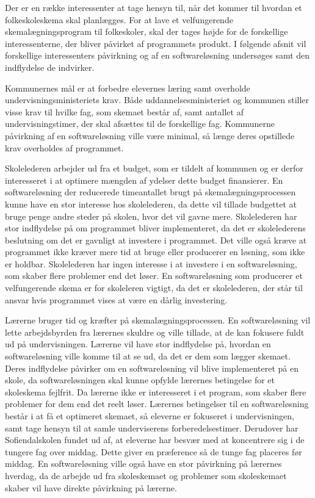 Der er en række interessenter at tage hensyn til, når det kommer til hvordan et folkeskoleskema skal planlægges. For at lave et velfungerende skemalægningsprogram til folkeskoler, skal der tages højde for de forskellige interessenterne, der bliver påvirket af programmets produkt. I følgende afsnit vil forskellige interessenters påvirkning og af en softwareløsning undersøges samt den indflydelse de indvirker. 


Kommunernes mål er at forbedre elevernes læring samt overholde undervisningsministeriets krav. Både uddannelsesministeriet og kommunen stiller visse krav til hvilke fag, som skemaet består af, samt antallet af undervisningstimer, der skal afsættes til de forskellige fag. Kommunerne påvirkning af en softwareløsning ville være minimal, så længe deres opstillede krav overholdes af programmet.


Skolelederen arbejder ud fra et budget, som er tildelt af kommunen og er derfor interesseret i at optimere mængden af ydelser dette budget finansierer. En softwareløsning der reducerede timeantallet brugt på skemalægningsprocessen kunne have en stor interesse hos skolelederen, da dette vil tillade budgettet at bruge penge andre steder på skolen, hvor det vil gavne mere. Skolelederen har stor indflydelse på om programmet bliver implementeret, da det er skolelederens beslutning om det er gavnligt at investere i programmet. Det ville også kræve at programmet ikke kræver mere tid at bruge eller producerer en løsning, som ikke er holdbar. Skolelederen har ingen interesse i at investere i en softwareløsning, som skaber flere problemer end det løser. En softwareløsning som producerer et velfungerende skema er for skoleleren vigtigt, da det er skolelederen, der står til ansvar hvis programmet vises at være en dårlig investering.


Lærerne bruger tid og kræfter på skemalægningsprocessen. En softwareløsning vil lette arbejdsbyrden fra lærernes skuldre og ville tillade, at de kan fokusere fuldt ud på undervisningen. Lærerne vil have stor indflydelse på, hvordan en softwareløsning ville komme til at se ud, da det er dem som lægger skemaet. Deres indflydelse påvirker om en softwareløsning vil blive implementeret på en skole, da softwareløsningen skal kunne opfylde lærernes betingelse for et skoleskema fejlfrit. Da lærerne ikke er interesseret i et program, som skaber flere problemer for dem end det reelt løser. Lærernes betingelser til en softwareløsning består i at få et optimeret skemaet, så eleverne er fokuseret i undervisningen, samt tage hensyn til at samle underviserens forberedelsestimer. Derudover har Sofiendalskolen fundet ud af, at eleverne har besvær med at koncentrere sig i de tungere fag over middag. Dette giver en præference så de tunge fag placeres før middag. En softwareløsning ville også have en stor påvirkning på lærernes hverdag, da de arbejde ud fra skoleskemaet og problemer som skoleskemaet skaber vil have direkte påvirkning på lærerne.


